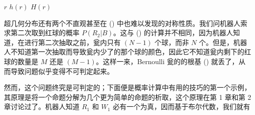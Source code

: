 {\startxtable[offset=0pt]
  \setupinterlinespace[line=1.2em]
  \startxtablehead[topframe=on, rulethickness=1.5pt]
  \startxrow
  \startxcell[width=3cm] $r$ \stopxcell
  \startxcell[width=3cm] $h(r)$ \stopxcell
  \startxcell[width=3cm] $H(r)$ \stopxcell
  \stopxrow
  \stopxtablehead
  \startxtablebody[height=fit]
  \startxrow[topframe=on,rulethickness=0.75pt]
   \stopxcell
   \stopxcell
   \stopxcell
  \stopxrow
  \startxrow
   \stopxcell
   \stopxcell
   \stopxcell
  \stopxrow
  \startxrow
   \stopxcell
   \stopxcell
   \stopxcell
  \stopxrow
  \startxrow
   \stopxcell
   \stopxcell
   \stopxcell
  \stopxrow
  \startxrow
   \stopxcell
   \stopxcell
   \stopxcell
  \stopxrow
  \startxrow
   \stopxcell
   \stopxcell
   \stopxcell
  \stopxrow
  \startxrow
   \stopxcell
   \stopxcell
   \stopxcell
  \stopxrow
  \startxrow
   \stopxcell
   \stopxcell
   \stopxcell
  \stopxrow
  \startxrow
   \stopxcell
   \stopxcell
   \stopxcell
  \stopxrow
  \startxrow
   \stopxcell
   \stopxcell
   \stopxcell
  \stopxrow
  \stopxtablebody
  \startxtablefoot[bottomframe=on,rulethickness=1.5pt]
  \startxrow
   \stopxcell
   \stopxcell
   \stopxcell
  \stopxrow
  \stopxtablefoot
  \stopxtable
}

超几何分布还有两个不直观甚至在 (\in[3-22]) 中也难以发现的对称性质。我们问机器人索求第二次取到红球的概率 $P(R_2|B)$。这与 (\in[3-8]) 的计算并不相同，因为机器人知道，在进行第二次抽取之前，瓮内只有 $(N - 1)$ 个球，而非 $N$ 个。但是，机器人不知道第一次抽取而导致瓮内少了的那个球的颜色，因此它不知道瓮内剩下的红球的数量是 $M$ 还是 $(M - 1)$。这样一来，Bernoulli 瓮的的根基 (\in[3-5]) 就丢了，从而导致问题似乎变得不可判定起来。

然而，这个问题终究是可判定的；下面便是概率计算中有用的技巧的第一个示例，其原理是将一个命题分解为几个更为简单的命题的析取，这个原理在第 1 章和第 2 章讨论过了。机器人知道 $R_1$ 和 $W_1$ 必有一个为真，因而基于布尔代数，我们就有


